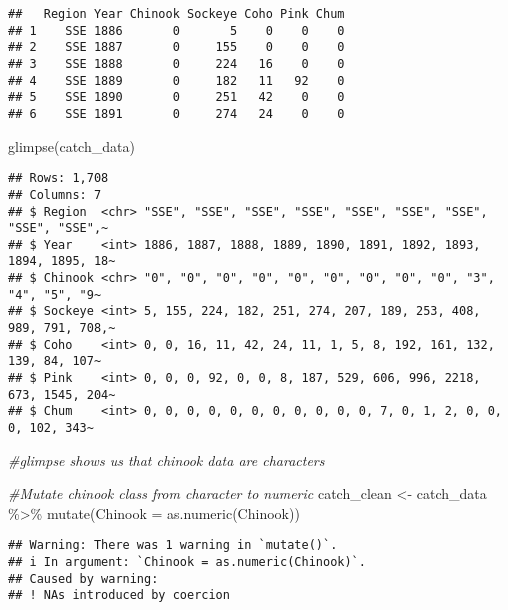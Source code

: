\documentclass[
]{article}
\newenvironment{Shaded}{\begin{snugshade}}{\end{snugshade}}
\newcommand{\AttributeTok}[1]{\textcolor[rgb]{0.77,0.63,0.00}{#1}}
\newcommand{\CommentTok}[1]{\textcolor[rgb]{0.56,0.35,0.01}{\textit{#1}}}
\newcommand{\FunctionTok}[1]{\textcolor[rgb]{0.00,0.00,0.00}{#1}}
\newcommand{\NormalTok}[1]{#1}
\newcommand{\OtherTok}[1]{\textcolor[rgb]{0.56,0.35,0.01}{#1}}
\newcommand{\SpecialCharTok}[1]{\textcolor[rgb]{0.00,0.00,0.00}{#1}}
\begin{document}
\begin{verbatim}
##   Region Year Chinook Sockeye Coho Pink Chum
## 1    SSE 1886       0       5    0    0    0
## 2    SSE 1887       0     155    0    0    0
## 3    SSE 1888       0     224   16    0    0
## 4    SSE 1889       0     182   11   92    0
## 5    SSE 1890       0     251   42    0    0
## 6    SSE 1891       0     274   24    0    0
\end{verbatim}

\begin{Shaded}
\begin{Highlighting}[]
\FunctionTok{glimpse}\NormalTok{(catch\_data)}
\end{Highlighting}
\end{Shaded}

\begin{verbatim}
## Rows: 1,708
## Columns: 7
## $ Region  <chr> "SSE", "SSE", "SSE", "SSE", "SSE", "SSE", "SSE", "SSE", "SSE",~
## $ Year    <int> 1886, 1887, 1888, 1889, 1890, 1891, 1892, 1893, 1894, 1895, 18~
## $ Chinook <chr> "0", "0", "0", "0", "0", "0", "0", "0", "0", "3", "4", "5", "9~
## $ Sockeye <int> 5, 155, 224, 182, 251, 274, 207, 189, 253, 408, 989, 791, 708,~
## $ Coho    <int> 0, 0, 16, 11, 42, 24, 11, 1, 5, 8, 192, 161, 132, 139, 84, 107~
## $ Pink    <int> 0, 0, 0, 92, 0, 0, 8, 187, 529, 606, 996, 2218, 673, 1545, 204~
## $ Chum    <int> 0, 0, 0, 0, 0, 0, 0, 0, 0, 0, 0, 7, 0, 1, 2, 0, 0, 0, 102, 343~
\end{verbatim}

\begin{Shaded}
\begin{Highlighting}[]
\CommentTok{\#glimpse shows us that \textquotesingle{}chinook\textquotesingle{} data are characters}
\end{Highlighting}
\end{Shaded}

\begin{Shaded}
\begin{Highlighting}[]
\CommentTok{\#Mutate chinook class from character to numeric}
\NormalTok{catch\_clean }\OtherTok{\textless{}{-}}\NormalTok{ catch\_data }\SpecialCharTok{\%\textgreater{}\%}
  \FunctionTok{mutate}\NormalTok{(}\AttributeTok{Chinook =} \FunctionTok{as.numeric}\NormalTok{(Chinook))}
\end{Highlighting}
\end{Shaded}

\begin{verbatim}
## Warning: There was 1 warning in `mutate()`.
## i In argument: `Chinook = as.numeric(Chinook)`.
## Caused by warning:
## ! NAs introduced by coercion
\end{verbatim}
\end{document}
